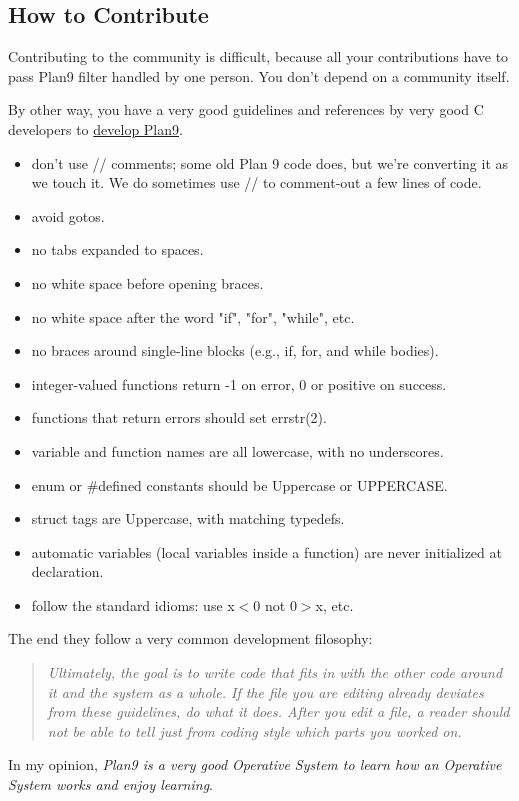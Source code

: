 \subsection{How to Contribute}

\par Contributing to the community is difficult, because all your contributions have to pass Plan9 filter handled by one person. You don't depend on a community itself.

\par By other way, you have a very good guidelines and references by very good C developers to \href{http://plan9.bell-labs.com/magic/man2html/6/style}{develop Plan9}.

\begin{itemize}
	\item don't use // comments; some old Plan 9 code does, but we're converting it as we touch it. We do sometimes use // to comment-out a few lines of code.
	\item avoid gotos.
	\item no tabs expanded to spaces.
	\item no white space before opening braces.
	\item no white space after the word "if", "for", "while", etc.
	\item no braces around single-line blocks (e.g., if, for, and while bodies).
	\item integer-valued functions return -1 on error, 0 or positive on success.
	\item functions that return errors should set errstr(2).
	\item variable and function names are all lowercase, with no underscores.
	\item enum or \#defined constants should be Uppercase or UPPERCASE.
	\item struct tags are Uppercase, with matching typedefs.
	\item automatic variables (local variables inside a function) are never initialized at declaration.
	\item follow the standard idioms: use x$<$0 not 0$>$x, etc.
\end{itemize} The end they follow a very common development filosophy:

\begin{quotation}
    \textit{Ultimately, the goal is to write code that fits in with the other code around it and the system as a whole. If the file you are editing already deviates from these guidelines, do what it does. After you edit a file, a reader should not be able to tell just from coding style which parts you worked on.}
\end{quotation}

\par In my opinion, \textit{Plan9 is a very good Operative System to learn how an Operative System works and enjoy learning}.

